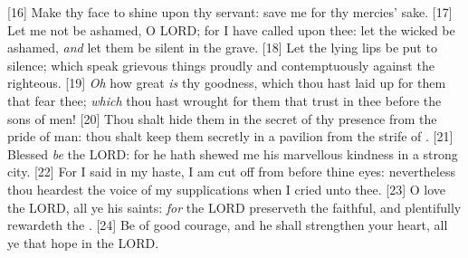 [16] \textcolor[cmyk]{0.99998,1,0,0}{Make thy face to shine upon thy servant: save me for thy mercies' sake.}
[17] \textcolor[cmyk]{0.99998,1,0,0}{Let me not be ashamed, O LORD; for I have called upon thee: let the wicked be ashamed, \emph{and} let them be silent in the grave.}
[18] \textcolor[cmyk]{0.99998,1,0,0}{Let the lying lips be put to silence; which speak grievous things proudly and contemptuously against the righteous.}
[19] \textcolor[cmyk]{0.99998,1,0,0}{\emph{Oh} how great \emph{is} thy goodness, which thou hast laid up for them that fear thee; \emph{which} thou hast wrought for them that trust in thee before the sons of men!}
[20] \textcolor[cmyk]{0.99998,1,0,0}{Thou shalt hide them in the secret of thy presence from the pride of man: thou shalt keep them secretly in a pavilion from the strife of .}
[21] \textcolor[cmyk]{0.99998,1,0,0}{Blessed \emph{be} the LORD: for he hath shewed me his marvellous kindness in a strong city.}
[22] \textcolor[cmyk]{0.99998,1,0,0}{For I said in my haste, I am cut off from before thine eyes: nevertheless thou heardest the voice of my supplications when I cried unto thee.}
[23] \textcolor[cmyk]{0.99998,1,0,0}{O love the LORD, all ye his saints: \emph{for} the LORD preserveth the faithful, and plentifully rewardeth the .}
[24] \textcolor[cmyk]{0.99998,1,0,0}{Be of good courage, and he shall strengthen your heart, all ye that hope in the LORD.}